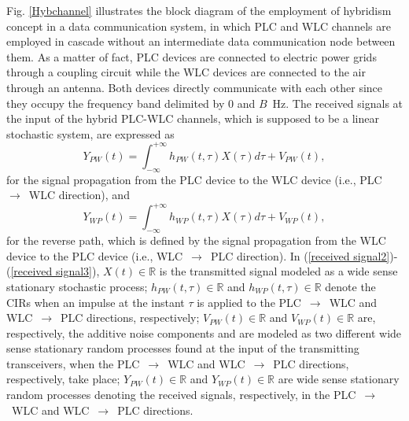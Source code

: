 \documentclass[journal]{IEEEtran}
\begin{document}
Fig. \ref{Hybchannel} illustrates the block diagram of the employment of hybridism concept in a data communication system, in which \ac{PLC} and \ac{WLC} channels are employed in cascade without an intermediate data communication node between them. As a matter of fact, \ac{PLC} devices are connected to electric power grids through a coupling circuit while the \ac{WLC} devices are connected to the air through an antenna. Both devices directly communicate with each other since they occupy the frequency band delimited by $0$ and $B$~Hz. The received signals at the input of the hybrid \ac{PLC}-\ac{WLC} channels, which is supposed to be a linear stochastic system, are expressed as
\begin{equation} \label{received signal2}
Y_{PW}(t) = \int_{-\infty}^{+\infty} h_{PW}(t,\tau) X(\tau) d\tau + V_{PW}(t),
\end{equation}
for the signal propagation from the \ac{PLC} device to the \ac{WLC} device (i.e., \ac{PLC}~$\rightarrow$~\ac{WLC} direction), and
\begin{equation} \label{received signal3}
Y_{WP}(t) = \int_{-\infty}^{+\infty} h_{WP}(t,\tau) X(\tau) d\tau + V_{WP}(t),
\end{equation}
for the reverse path, which is defined by the signal propagation from the \ac{WLC} device to the \ac{PLC} device (i.e., \ac{WLC}~$\rightarrow$~\ac{PLC} direction). In (\ref{received signal2})-(\ref{received signal3}),  $X(t)\in \mathbb{R}$ is the transmitted signal modeled as a wide sense stationary stochastic process; $h_{PW}(t,\tau)\in \mathbb{R}$ and $h_{WP}(t,\tau)\in \mathbb{R}$ denote the \acp{CIR} when an impulse at the instant $\tau$ is applied to the \ac{PLC}~$\rightarrow$~\ac{WLC} and \ac{WLC}~$\rightarrow$~\ac{PLC} directions, respectively; $V_{PW}(t)\in \mathbb{R}$ and $V_{WP}(t)\in \mathbb{R}$ are, respectively, the additive noise components and are modeled as two different wide sense stationary random processes found at the input of the transmitting transceivers, when the \ac{PLC}~$\rightarrow$~\ac{WLC} and \ac{WLC}~$\rightarrow$~\ac{PLC} directions, respectively, take place; $Y_{PW}(t)\in \mathbb{R}$ and ${Y}_{WP}(t)\in \mathbb{R}$ are wide sense stationary random processes denoting the received signals, respectively, in the \ac{PLC}~$\rightarrow$~\ac{WLC} and \ac{WLC}~$\rightarrow$~\ac{PLC} directions.
\end{document}
